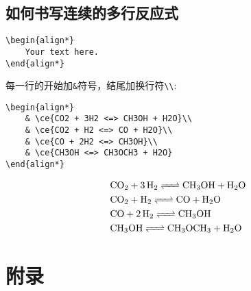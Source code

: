 \documentclass[UTF8, a4paper]{article}
\begin{document}
\subsection{如何书写连续的多行反应式}
\begin{Verbatim}[tabsize=4]
\begin{align*}
	Your text here.
\end{align*}
\end{Verbatim}
每一行的开始加\verb|&|符号，结尾加换行符\verb|\\|:\\
\begin{minipage}{.5\textwidth}
\begin{Verbatim}[tabsize=4]
\begin{align*}
	& \ce{CO2 + 3H2 <=> CH3OH + H2O}\\
	& \ce{CO2 + H2 <=> CO + H2O}\\
	& \ce{CO + 2H2 <=> CH3OH}\\
	& \ce{CH3OH <=> CH3OCH3 + H2O}
\end{align*}
\end{Verbatim}
\end{minipage}
\begin{minipage}{.5\textwidth}
\begin{align*}
	& \ce{CO2 + 3H2 <=> CH3OH + H2O}\\
	& \ce{CO2 + H2 <=> CO + H2O}\\
	& \ce{CO + 2H2 <=> CH3OH}\\
	& \ce{CH3OH <=> CH3OCH3 + H2O}
\end{align*}
\end{minipage}


\section{附录}
\end{document}
